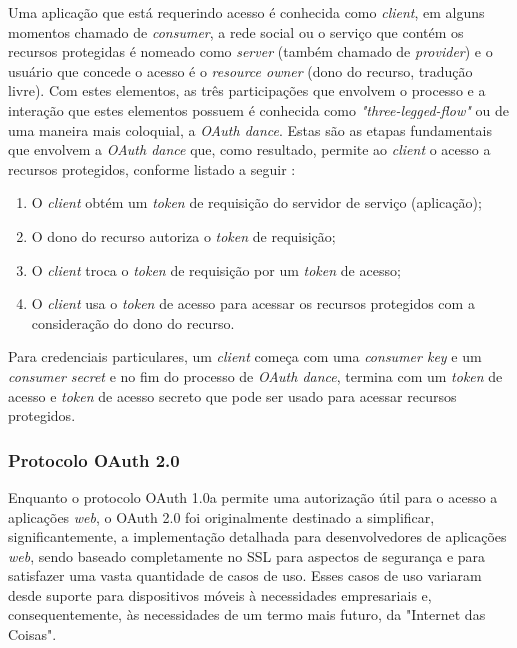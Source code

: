 Uma aplicação que está requerindo acesso é conhecida como \textit{client}, em alguns momentos chamado de \textit{consumer}, a rede social ou o serviço que contém os recursos protegidas é nomeado como \textit{server} (também chamado de \textit{provider}) e o usuário que concede o acesso é o \textit{resource owner} (dono do recurso, tradução livre). Com estes elementos, as três participações que envolvem o processo e a interação que estes elementos possuem é conhecida como \textit{"three-legged-flow"} ou de uma maneira mais coloquial, a \textit{OAuth dance}. Estas são as etapas fundamentais que envolvem a \textit{OAuth dance} que, como resultado, permite ao \textit{client} o acesso a recursos protegidos, conforme listado a seguir \cite{mining-social-web}:

\begin{enumerate}
	\item O \textit{client} obtém um \textit{token} de requisição do servidor de serviço (aplicação);
	\item O dono do recurso autoriza o \textit{token} de requisição;
	\item O \textit{client} troca o \textit{token} de requisição por um \textit{token} de acesso;
	\item O \textit{client} usa o \textit{token} de acesso para acessar os recursos protegidos com a consideração do dono do recurso.
\end{enumerate}

Para credenciais particulares, um \textit{client} começa com uma \textit{consumer key} e um \textit{consumer secret} e no fim do processo de \textit{OAuth dance}, termina com um \textit{token} de acesso e \textit{token} de acesso secreto que pode ser usado para acessar recursos protegidos.

\subsubsection{Protocolo OAuth 2.0}
Enquanto o protocolo OAuth 1.0a permite uma autorização útil para o acesso a aplicações \textit{web}, o OAuth 2.0 foi originalmente destinado a simplificar, significantemente, a implementação detalhada para desenvolvedores de aplicações \textit{web}, sendo baseado completamente no SSL para aspectos de segurança e para satisfazer uma vasta quantidade de casos de uso. Esses casos de uso variaram desde suporte para dispositivos móveis à necessidades empresariais e, consequentemente, às necessidades de um termo mais futuro, da "Internet das Coisas"\space \cite{mining-social-web}.

